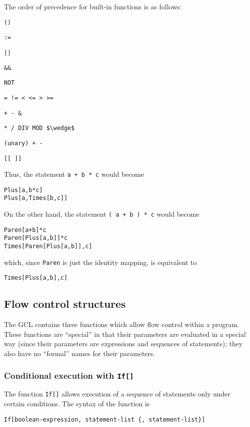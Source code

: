 The order of precedence for built-in functions is as follows:
\bd
\item
\verb+()+
\item
\verb+:=+
\item
\verb+||+
\item
\verb+&&+
\item
\verb+NOT+
\item
\verb+= != < <= > >=+
\item
\verb&+ - &\verb+&+
\item
\verb+* / DIV MOD $\wedge$+
\item
\verb&(unary) + -&
\item
\verb+[[ ]]+
\ed

Thus, the statement \verb&a + b * c& would become 
\begin{verbatim}
Plus[a,b*c]
Plus[a,Times[b,c]]
\end{verbatim}

\noindent
On the other hand, the statement \verb&( a + b ) * c& would become 
\begin{verbatim}
Paren[a+b]*c
Paren[Plus[a,b]]*c
Times[Paren[Plus[a,b]],c]
\end{verbatim}

\noindent
which, since \verb+Paren+ is just the identity mapping, is equivalent to
\begin{verbatim}
Times[Plus[a,b],c]
\end{verbatim}

\medskip

\subsection{Flow control structures}

The GCL contains three functions which allow flow control within a
program.  These functions are ``special'' in that their parameters
are evaluated in a special way (since their parameters are expressions
and sequences of statements); they also have no ``formal'' names for
their parameters.

\subsubsection{Conditional execution with {\tt If[]}}

The function \verb+If[]+ allows execution of a sequence of statements
only under certain conditions.  The syntax of the function is

\begin{verbatim}
If[boolean-expression, statement-list {, statement-list}]
\end{verbatim}


